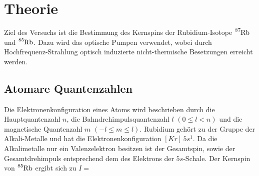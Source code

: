 \section{Theorie}
\label{sec:Theorie}
Ziel des Versuchs ist die Bestimmung des Kernspins der Rubidium-Isotope $\ce{^{87}Rb}$ und $\ce{^{85}Rb}$.
Dazu wird das optische Pumpen verwendet, wobei durch Hochfrequenz-Strahlung optisch induzierte nicht-thermische Besetzungen erreicht werden.

\subsection{Atomare Quantenzahlen}
Die Elektronenkonfiguration eines Atoms wird beschrieben durch die Hauptquantenzahl $n$, die Bahndrehimpulsquantenzahl $l$ $(0 \leq l < n)$ und die
magnetische Quantenzahl $m$ $(-l \leq m \leq l)$. 
Rubidium gehört zu der Gruppe der Alkali-Metalle und hat die
Elektronenkonfiguration $[Kr]\,5s^1$. Da die Alkalimetalle nur ein Valenzelektron besitzen ist der Gesamtspin, sowie der Gesamtdrehimpuls
entsprechend dem des Elektrons der $5s$-Schale. Der Kernspin von $\ce{^{85}Rb}$ ergibt sich zu $I = $ 